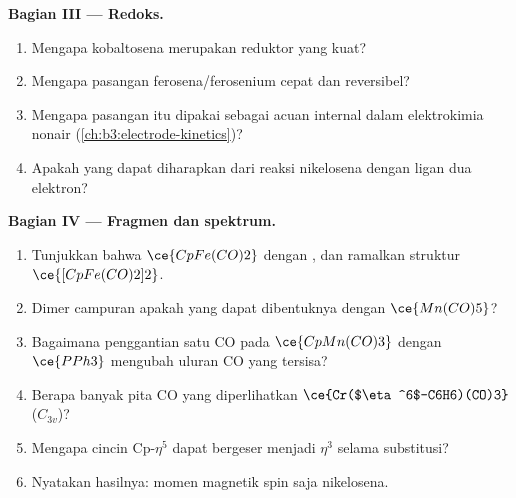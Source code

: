 \begin{problem}
\medskip\noindent\textbf{Bagian III --- Redoks.}
\begin{enumerate}[resume, beginpenalty=10000]
  \item Mengapa kobaltosena merupakan reduktor yang kuat?
  \item Mengapa pasangan ferosena/ferosenium cepat dan reversibel?
  \item Mengapa pasangan itu dipakai sebagai acuan internal dalam elektrokimia nonair
        (\cref{ch:b3:electrode-kinetics})?
  \item Apakah yang dapat diharapkan dari reaksi nikelosena dengan ligan
        dua elektron?
\end{enumerate}

\medskip\noindent\textbf{Bagian IV --- Fragmen dan spektrum.}
\begin{enumerate}[resume, beginpenalty=10000]
  \item Tunjukkan bahwa $\ce{CpFe(CO)2}$  dengan , dan ramalkan struktur
        $\ce{[CpFe(CO)2]2}$.
  \item Dimer campuran apakah yang dapat dibentuknya dengan $\ce{Mn(CO)5}$?
  \item Bagaimana penggantian satu CO pada $\ce{CpMn(CO)3}$ dengan $\ce{PPh3}$ mengubah uluran CO
        yang tersisa?
  \item Berapa banyak pita CO yang diperlihatkan $\ce{Cr($\eta^6$-C6H6)(CO)3}$ ($C_{3v}$)?
  \item Mengapa cincin Cp-$\eta^5$ dapat bergeser menjadi $\eta^3$ selama substitusi?
  \item Nyatakan hasilnya: momen magnetik spin saja nikelosena.
\end{enumerate}
\end{problem}
